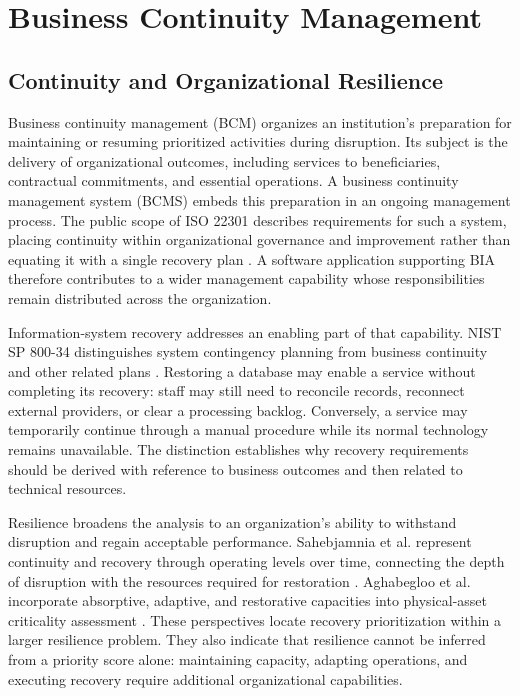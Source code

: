 \section{Business Continuity Management}
\label{sec:lr_bcm}

\subsection{Continuity and Organizational Resilience}
\label{sec:lr_context}

Business continuity management (BCM) organizes an institution's preparation for maintaining or resuming prioritized activities during disruption. Its subject is the delivery of organizational outcomes, including services to beneficiaries, contractual commitments, and essential operations. A business continuity management system (BCMS) embeds this preparation in an ongoing management process. The public scope of ISO 22301 describes requirements for such a system, placing continuity within organizational governance and improvement rather than equating it with a single recovery plan \cite{iso22301catalogue}. A software application supporting BIA therefore contributes to a wider management capability whose responsibilities remain distributed across the organization.

Information-system recovery addresses an enabling part of that capability. NIST SP 800-34 distinguishes system contingency planning from business continuity and other related plans \cite{nist2010contingency}. Restoring a database may enable a service without completing its recovery: staff may still need to reconcile records, reconnect external providers, or clear a processing backlog. Conversely, a service may temporarily continue through a manual procedure while its normal technology remains unavailable. The distinction establishes why recovery requirements should be derived with reference to business outcomes and then related to technical resources.

Resilience broadens the analysis to an organization's ability to withstand disruption and regain acceptable performance. Sahebjamnia et al. represent continuity and recovery through operating levels over time, connecting the depth of disruption with the resources required for restoration \cite{sahebjamnia2015integrated}. Aghabegloo et al. incorporate absorptive, adaptive, and restorative capacities into physical-asset criticality assessment \cite{assetcriticality2023}. These perspectives locate recovery prioritization within a larger resilience problem. They also indicate that resilience cannot be inferred from a priority score alone: maintaining capacity, adapting operations, and executing recovery require additional organizational capabilities.

